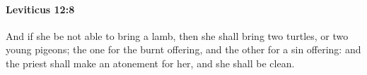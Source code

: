 
		\paragraph{Leviticus 12:8} %
			\label{LEVITICUS-12-8}

			And if she be not able to bring a lamb, then she shall bring two turtles, or two young pigeons; the one for the burnt offering, and the other for a sin offering: and the priest shall make an atonement for her, and she shall be clean.

